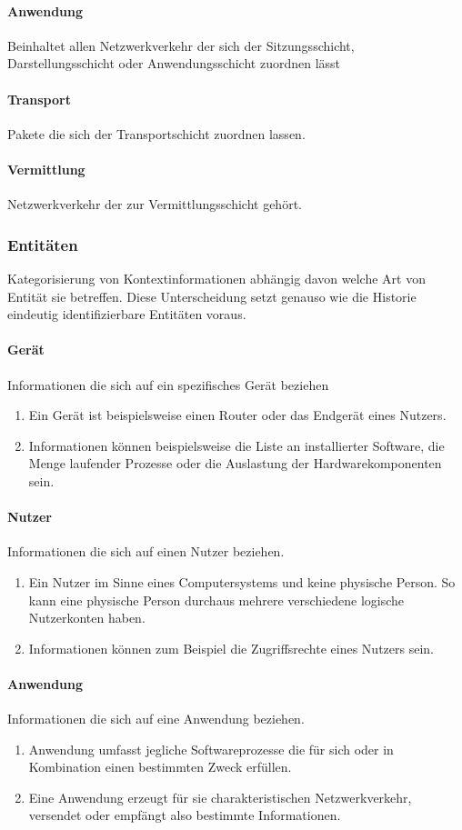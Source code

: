 \paragraph{Anwendung}
Beinhaltet allen Netzwerkverkehr der sich der Sitzungsschicht, Darstellungsschicht oder Anwendungsschicht zuordnen lässt 
\paragraph{Transport}
Pakete die sich der Transportschicht zuordnen lassen.
\paragraph{Vermittlung}
Netzwerkverkehr der zur Vermittlungsschicht gehört.
\subsubsection{Entitäten}
Kategorisierung von Kontextinformationen abhängig davon welche Art von Entität sie betreffen.
Diese Unterscheidung setzt genauso wie die Historie eindeutig identifizierbare Entitäten voraus.
\paragraph{Gerät}
Informationen die sich auf ein spezifisches Gerät beziehen
\begin{enumerate}
\item{Ein Gerät ist beispielsweise einen Router oder das Endgerät eines Nutzers. }
\item{Informationen können beispielsweise die Liste an installierter Software, die Menge laufender Prozesse oder die Auslastung der Hardwarekomponenten sein.}
\end{enumerate}
\paragraph{Nutzer}
Informationen die sich auf einen Nutzer beziehen.
\begin{enumerate}
\item{Ein Nutzer im Sinne eines Computersystems und keine physische Person. So kann eine physische Person durchaus mehrere verschiedene logische Nutzerkonten haben. }
\item{Informationen können zum Beispiel die Zugriffsrechte eines Nutzers sein.}
\end{enumerate}
\paragraph{Anwendung}
Informationen die sich auf eine Anwendung beziehen.
\begin{enumerate}
\item{Anwendung umfasst jegliche Softwareprozesse die für sich oder in Kombination einen bestimmten Zweck erfüllen.}
\item{Eine Anwendung erzeugt für sie charakteristischen Netzwerkverkehr, versendet oder empfängt also bestimmte Informationen.}
\end{enumerate}

